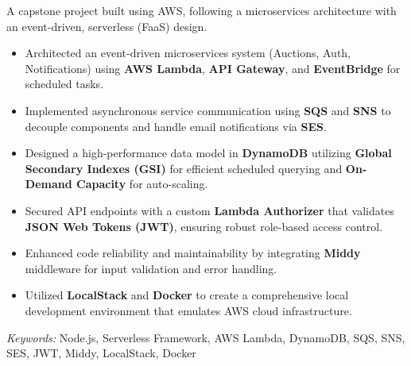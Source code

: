 \nointent
{}


\nointent
A capstone project built using AWS, following a microservices architecture with an event-driven, serverless (FaaS) design.

\begin{itemize}
    \item Architected an event-driven microservices system (Auctions, Auth, Notifications) using \textbf{AWS Lambda}, \textbf{API Gateway}, and \textbf{EventBridge} for scheduled tasks.
    \item Implemented asynchronous service communication using \textbf{SQS} and \textbf{SNS} to decouple components and handle email notifications via \textbf{SES}.
    \item Designed a high-performance data model in \textbf{DynamoDB} utilizing \textbf{Global Secondary Indexes (GSI)} for efficient scheduled querying and \textbf{On-Demand Capacity} for auto-scaling.
    \item Secured API endpoints with a custom \textbf{Lambda Authorizer} that validates \textbf{JSON Web Tokens (JWT)}, ensuring robust role-based access control.
    \item Enhanced code reliability and maintainability by integrating \textbf{Middy} middleware for input validation and error handling.
    \item Utilized \textbf{LocalStack} and \textbf{Docker} to create a comprehensive local development environment that emulates AWS cloud infrastructure.
\end{itemize}

\noindent
\textit{Keywords:} Node.js, Serverless Framework, AWS Lambda, DynamoDB, SQS, SNS, SES, JWT, Middy, LocalStack, Docker

\vspace{1em}